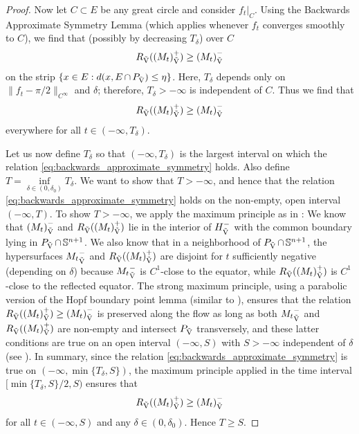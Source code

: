 \documentclass{amsart}
\begin{document}
\begin{proof}
Now let \(C\subset E\) be any great circle and consider \(f_t|_C\). Using the Backwards Approximate Symmetry Lemma \cite[Lemma 5.1]{bryanlouie} (which applies whenever \(f_t\) converges smoothly to \(C\)), we find that (possibly by decreasing \(T_{\delta}\)) over \(C\)
\[
R_{\operatorname{\vec{V}}}({(M_t)}_{\operatorname{\vec{V}}}^+) \geq {(M_t)}_{\operatorname{\vec{V}}}^-
\]
on the strip \(\{x \in E: d(x, E \operatorname{\cap} P_{\operatorname{\vec{V}}}) \leq \eta\}\). Here, \(T_{\delta}\) depends only on \(\|f_t - \pi/2\|_{C^{\infty}}\) and \(\delta\); therefore, \(T_{\delta} > - \infty\) is independent of \(C\). Thus we find that
\begin{equation}
\label{eq:backwards_approximate_symmetry}
R_{\operatorname{\vec{V}}}({(M_t)}_{\operatorname{\vec{V}}}^+) \geq {(M_t)}_{\operatorname{\vec{V}}}^-
\end{equation}
everywhere for all \(t \in (-\infty, T_{\delta})\).

Let us now define \(T_{\delta}\) so that \((-\infty, T_{\delta})\) is the largest interval on which the relation \eqref{eq:backwards_approximate_symmetry} holds. Also define \(T = \inf\limits_{\delta \in (0,\delta_0)} T_{\delta}\). We want to show that \(T > -\infty\), and hence that the relation \eqref{eq:backwards_approximate_symmetry} holds on the non-empty, open interval \((-\infty, T)\). To show $T>-\infty$, we apply the maximum principle as in \cite[Lemma 5.2]{bryanlouie}: We know that \({(M_t)}_{\operatorname{\vec{V}}}^-\) and \(R_{\operatorname{\vec{V}}}({(M_t)}_{\operatorname{\vec{V}}}^+)\) lie in the interior of \({H}_{{\operatorname{\vec{V}}}}^-\) with the common boundary lying in \(P_{\operatorname{\vec{V}}} \operatorname{\cap} \mathbb{S}^{n+1}\). We also know that in a neighborhood of \(P_{\operatorname{\vec{V}}} \operatorname{\cap} \mathbb{S}^{n+1}\), the hypersurfaces \({M_t}_{\operatorname{\vec{V}}}^-\) and \(R_{\operatorname{\vec{V}}}({(M_t)}_{\operatorname{\vec{V}}}^+)\) are disjoint for \(t\) sufficiently negative (depending on \(\delta\)) because \({M_t}_{\operatorname{\vec{V}}}^-\) is \(C^1\)-close to the equator, while \(R_{\operatorname{\vec{V}}}({(M_t)}_{\operatorname{\vec{V}}}^+)\) is \(C^1\)-close to the reflected equator. The strong maximum principle, using a parabolic version of the Hopf boundary point lemma (similar to \cite[Theorem 2.2]{MR1483984}), ensures that the  relation \(R_{\operatorname{\vec{V}}}({(M_t)}_{\operatorname{\vec{V}}}^+) \geq {(M_t)}_{\operatorname{\vec{V}}}^-\) is preserved along the flow as long as both \({M_t}_{\operatorname{\vec{V}}}^-\) and \(R_{\operatorname{\vec{V}}}({(M_t)}_{\operatorname{\vec{V}}}^+)\) are non-empty and intersect \(P_{\operatorname{\vec{V}}}\) transversely, and these latter conditions are true on an open interval \((-\infty, S)\) with \(S>-\infty\) independent of \(\delta\) (see \cite[Lemma 5.2]{bryanlouie}). In summary, since the relation \eqref{eq:backwards_approximate_symmetry} is true on \((-\infty, \min\{T_{\delta},S\})\), the maximum principle applied in the time interval $[\min\{T_{\delta},S\}/2,S)$ ensures that
\begin{equation*}
\label{eq:longtime_approximate_symmetry}
R_{\operatorname{\vec{V}}}({(M_t)}_{\operatorname{\vec{V}}}^+) \geq {(M_t)}_{\operatorname{\vec{V}}}^-
\end{equation*}
for all \(t \in (-\infty, S)\) and any \(\delta \in (0,\delta_0)\). Hence $T\ge S.$


\end{proof}
\end{document}
